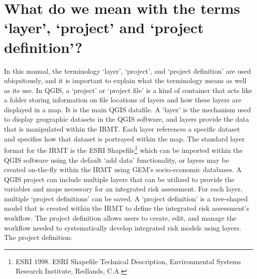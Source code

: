 \chapter{What do we mean with the terms `layer', `project' and `project definition'?}
\label{sec:definitions}

In this manual, the terminology `layer', `project', and `project definition'
are used ubiquitously, and it is important to explain what the terminology
means as well as its use. In QGIS, a `project' or `project file' is a kind of
container that acts like a folder storing information on file locations of
layers and how these layers are displayed in a map. It is the main QGIS
datafile. A `layer' is the mechanism used to display geographic datasets in the
QGIS software, and layers provide the data that is manipulated within the
IRMT\@.  Each layer references a specific dataset and specifies how that
dataset is portrayed within the map. The standard layer format for the IRMT is
the ESRI Shapefile\footnote{ESRI 1998. ESRI Shapefile Technical Description,
Environmental Systems Research Institute, Redlands, C.A.} which can be imported
within the QGIS software using the default `add data' functionality, or layers
may be created on-the-fly within the IRMT using GEM's socio-economic databases.
A QGIS project can include multiple layers that can be utilized to provide the
variables and maps necessary for an integrated risk assessment. For each layer,
multiple `project definitions' can be saved. A `project definition' is a
tree-shaped model that is created within the IRMT to define the integrated risk
assessment's workflow. The project definition allows users to create, edit, and
manage the workflow needed to systematically develop integrated risk models
using layers. The project definition:

